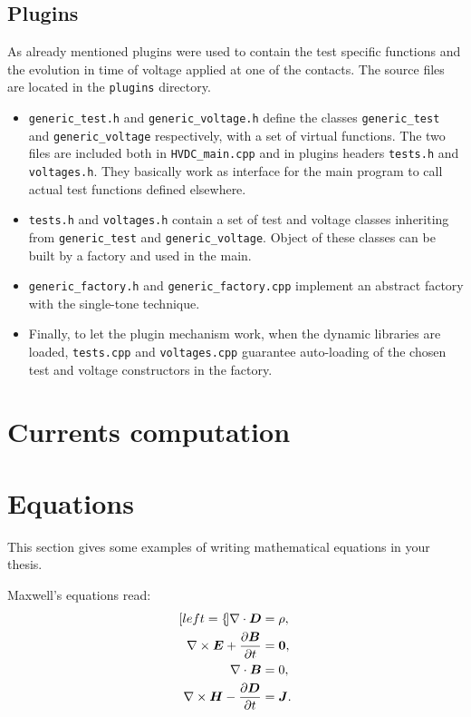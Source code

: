 \documentclass[11pt,a4paper]{article}
\begin{document}
\subsection{Plugins}
As already mentioned plugins were used to contain the test specific functions and the evolution in time of voltage applied at one of the contacts. The source files are located in the \texttt{plugins} directory. 
\begin{itemize}
	\item \texttt{generic\_test.h} and \texttt{generic\_voltage.h} define the classes \texttt{generic\_test} and \texttt{generic\_voltage} respectively, with a set of virtual functions. The two files are included both in \texttt{HVDC\_main.cpp} and in plugins headers \texttt{tests.h} and \texttt{voltages.h}. They basically work as interface for the main program to call actual test functions defined elsewhere.
	\item \texttt{tests.h} and \texttt{voltages.h} contain a set of test and voltage classes inheriting from \texttt{generic\_test} and \texttt{generic\_voltage}. Object of these classes can be built by a factory and used in the main.
	\item \texttt{generic\_factory.h} and \texttt{generic\_factory.cpp} implement an abstract factory with the single-tone technique.
	\item Finally, to let the plugin mechanism work, when the dynamic libraries are loaded, \texttt{tests.cpp} and \texttt{voltages.cpp} guarantee auto-loading of the chosen test and voltage constructors in the factory. 
\end{itemize}
\section{Currents computation}

\section{Equations}
\label{sec:eqs}
This section gives some examples of writing mathematical equations in your thesis.

Maxwell's equations read:
\begin{subequations}
    \label{eq:maxwell}
    \begin{align}[left=\empheqlbrace]
    \nabla\cdot \bm{D} & = \rho, \label{eq:maxwell1} \\
    \nabla \times \bm{E} +  \frac{\partial \bm{B}}{\partial t} & = \bm{0}, \label{eq:maxwell2} \\
    \nabla\cdot \bm{B} & = 0, \label{eq:maxwell3} \\
    \nabla \times \bm{H} - \frac{\partial \bm{D}}{\partial t} &= \bm{J}. \label{eq:maxwell4}
    \end{align}
\end{subequations}
\end{document}
